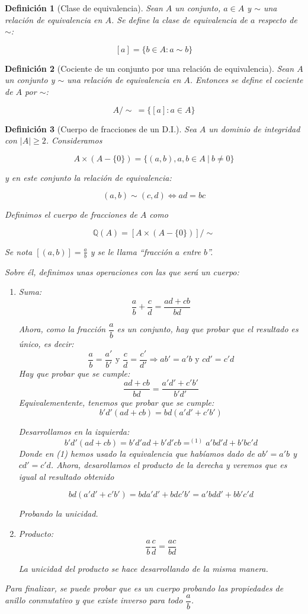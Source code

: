 \documentclass[11pt, a4paper, titlepage]{article}
\theoremstyle{theorem-style}
\theoremstyle{definition-style}
\newtheorem*{ndef}{Definición}
\theoremstyle{remark-style}
\theoremstyle{example-style}
\newenvironment{nlist}
{\begin{enumerate}
\renewcommand\labelenumi{(\emph{\roman{enumi})}}}
{\end{enumerate}}
\begin{document}
\begin{ndef}[Clase de equivalencia]
  Sean $A$ un conjunto, $a\in A$ y $\sim$ una relación de equivalencia en $A$. Se define la clase de equivalencia
  de $a$ respecto de $\sim$:

  \[
     [a] = \{ b \in A : a \sim b \}
  \]
\end{ndef}

\begin{ndef}[Cociente de un conjunto por una relación de equivalencia]
  Sean $A$ un conjunto y $\sim$ una relación de equivalencia en $A$. Entonces se define el cociente de $A$ por $\sim$:

  \[
     A/\sim \ = \{ [a] : a \in A\}
  \]
\end{ndef}

\begin{ndef}[Cuerpo de fracciones de un D.I.]
  Sea $A$ un dominio de integridad con $|A| \geq 2$. Consideramos

  $$A\times (A-\{0\}) = \{(a,b), a,b \in A\ |\ b\neq 0\}$$

  y en este conjunto la relación de equivalencia:

  \[
     (a,b) \sim (c,d) \iff ad = bc
  \]

  Definimos el cuerpo de fracciones de $A$ como

  $$\mathbb{Q}(A) = [A\times (A-\{0\})]/\sim$$

    Se nota $[(a,b)] = \displaystyle\frac{a}{b}$ y se le llama ``fracción $a$ entre $b$''.

  Sobre él, definimos unas operaciones con las que será un cuerpo:
\begin{nlist}
	\item Suma: \[\frac{a}{b}+ \frac{c}{d} = \frac{ad + cb}{bd}\]

Ahora, como la fracción $\dfrac{a}{b}$ es un conjunto, hay que probar que el resultado es único, es decir:
\[
\frac{a}{b}= \frac{a'}{b'} \text{ y } \frac{c}{d}= \frac{c'}{d'}  \Rightarrow ab' = a'b \text{ y } cd' = c'd
\]
Hay que probar que se cumple:
\[
\frac{ad+cb}{bd} = \frac{a'd'+c'b'}{b'd'}
\]
Equivalementente, tenemos que probar que se cumple:
\[
b'd'(ad+cb) = bd(a'd'+c'b')
\]

Desarrollamos en la izquierda:
\[
b'd'(ad+cb) = b'd'ad + b'd'cb =^{(1)} a'bd'd + b'bc'd
\]
Donde en (1) hemos usado la equivalencia que habíamos dado de $ab' = a'b$ y $cd' = c'd$. Ahora, desarollamos el producto de la derecha y veremos que es igual al resultado obtenido

\[
bd(a'd'+c'b') = bda'd' + bdc'b' = a'bdd' + bb'c'd
\]

Probando la unicidad. 
	
    \item Producto: \[\frac{a}{b} \frac{c}{d} = \frac{ac}{bd}\]

La unicidad del producto se hace desarrollando de la misma manera.
\end{nlist}



Para finalizar, se puede probar que es un cuerpo probando las propiedades de anillo conmutativo y que existe inverso para todo $\dfrac{a}{b}$.
\end{ndef}
\end{document}
